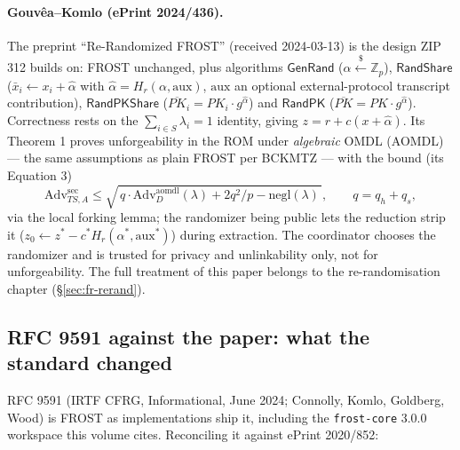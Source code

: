 \documentclass[11pt,a4paper]{article}
\theoremstyle{definition}
\newcommand{\Z}{\mathbb{Z}}
\begin{document}
\paragraph{Gouv\^ea--Komlo (ePrint 2024/436).} The preprint
``Re-Randomized FROST'' (received 2024-03-13) is the design ZIP 312
builds on: FROST unchanged, plus algorithms $\mathsf{GenRand}$
($\alpha \xleftarrow{\$} \Z_p$),
$\mathsf{RandShare}$ ($\bar{x}_i \gets x_i + \hat{\alpha}$ with
$\hat{\alpha} = H_r(\alpha, \mathrm{aux})$, $\mathrm{aux}$ an optional
external-protocol transcript contribution), $\mathsf{RandPKShare}$
($\overline{PK}_i = PK_i \cdot g^{\hat{\alpha}}$) and $\mathsf{RandPK}$
($\overline{PK} = PK \cdot g^{\hat{\alpha}}$). Correctness rests on the
$\sum_{i \in S} \lambda_i = 1$ identity, giving
$z = r + c(x + \hat{\alpha})$. Its Theorem 1 proves unforgeability in the
ROM under \emph{algebraic} OMDL (AOMDL) --- the same assumptions as plain
FROST per BCKMTZ --- with the bound (its Equation 3)
\[
\mathrm{Adv}^{\mathrm{sec}}_{TS,A} \le
\sqrt{\, q \cdot \mathrm{Adv}^{\mathrm{aomdl}}_{D}(\lambda)
+ 2 q^2 / p - \mathrm{negl}(\lambda) \,},
\qquad q = q_h + q_s,
\]
via the local forking lemma; the randomizer being public lets the
reduction strip it ($z_0 \gets z^* - c^* H_r(\alpha^*, \mathrm{aux}^*)$)
during extraction. The coordinator chooses the randomizer and is trusted
for privacy and unlinkability only, not for unforgeability.
The full treatment of this paper belongs to the re-randomisation chapter
(\S\ref{sec:fr-rerand}).

\subsection{RFC 9591 against the paper: what the standard changed}
\label{sec:fr-rfc}

RFC 9591 (IRTF CFRG, Informational, June 2024; Connolly, Komlo, Goldberg,
Wood) is FROST as implementations ship it, including the
\texttt{frost-core} 3.0.0 workspace this volume cites. Reconciling it
against ePrint 2020/852:
\end{document}
